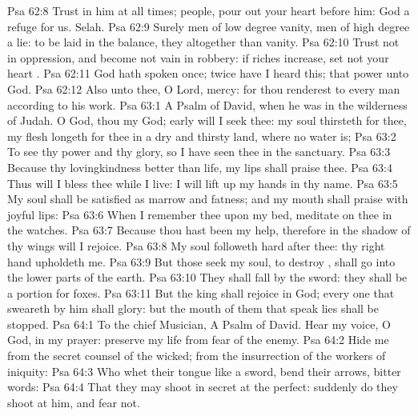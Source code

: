\vs Psa 62:8 Trust in him at all times;  people, pour out your heart before him: God  a refuge for us. Selah.
\vs Psa 62:9 Surely men of low degree  vanity,  men of high degree  a lie: to be laid in the balance, they  altogether  than vanity.
\vs Psa 62:10 Trust not in oppression, and become not vain in robbery: if riches increase, set not your heart .
\vs Psa 62:11 God hath spoken once; twice have I heard this; that power  unto God.
\vs Psa 62:12 Also unto thee, O Lord,  mercy: for thou renderest to every man according to his work.
\vs Psa 63:1 A Psalm of David, when he was in the wilderness of Judah. O God, thou  my God; early will I seek thee: my soul thirsteth for thee, my flesh longeth for thee in a dry and thirsty land, where no water is;
\vs Psa 63:2 To see thy power and thy glory, so  I have seen thee in the sanctuary.
\vs Psa 63:3 Because thy lovingkindness  better than life, my lips shall praise thee.
\vs Psa 63:4 Thus will I bless thee while I live: I will lift up my hands in thy name.
\vs Psa 63:5 My soul shall be satisfied as  marrow and fatness; and my mouth shall praise  with joyful lips:
\vs Psa 63:6 When I remember thee upon my bed,  meditate on thee in the  watches.
\vs Psa 63:7 Because thou hast been my help, therefore in the shadow of thy wings will I rejoice.
\vs Psa 63:8 My soul followeth hard after thee: thy right hand upholdeth me.
\vs Psa 63:9 But those  seek my soul, to destroy , shall go into the lower parts of the earth.
\vs Psa 63:10 They shall fall by the sword: they shall be a portion for foxes.
\vs Psa 63:11 But the king shall rejoice in God; every one that sweareth by him shall glory: but the mouth of them that speak lies shall be stopped.
\vs Psa 64:1 To the chief Musician, A Psalm of David. Hear my voice, O God, in my prayer: preserve my life from fear of the enemy.
\vs Psa 64:2 Hide me from the secret counsel of the wicked; from the insurrection of the workers of iniquity:
\vs Psa 64:3 Who whet their tongue like a sword,  bend  their arrows,  bitter words:
\vs Psa 64:4 That they may shoot in secret at the perfect: suddenly do they shoot at him, and fear not.
